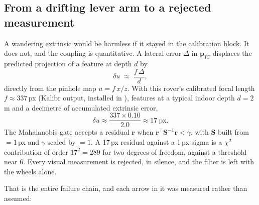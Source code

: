 \subsection{From a drifting lever arm to a rejected measurement}
\label{sec:levertochi2}

A wandering extrinsic would be harmless if it stayed in the calibration
block. It does not, and the coupling is quantitative. A lateral error
$\Delta$ in $\mathbf{p}_{IC}$ displaces the predicted projection of a
feature at depth $d$ by
\begin{equation}
\delta u \;\approx\; \frac{f\,\Delta}{d},
\label{eq:reproj}
\end{equation}
directly from the pinhole map $u = f\,x/z$. With this rover's calibrated
focal length $f \approx 337$\,px (Kalibr output, installed in ), features at a
typical indoor depth $d = 2$\,m and a decimetre of accumulated extrinsic
error,
\begin{equation}
\delta u \approx \frac{337 \times 0.10}{2.0} \approx 17\ \text{px}.
\end{equation}
The Mahalanobis gate accepts a residual $\mathbf{r}$ when $\mathbf{r}^{\top}
\mathbf{S}^{-1} \mathbf{r} < \gamma$, with $\mathbf{S}$ built from
 $= 1$\,px and $\gamma$ scaled by  $= 1$.
A 17\,px residual against a 1\,px sigma is a $\chi^2$ contribution of order
$17^2 = 289$ for two degrees of freedom, against a threshold near $6$.
Every visual measurement is rejected, in silence, and the filter is left
with the wheels alone.

That is the entire failure chain, and each arrow in it was measured rather
than assumed:

